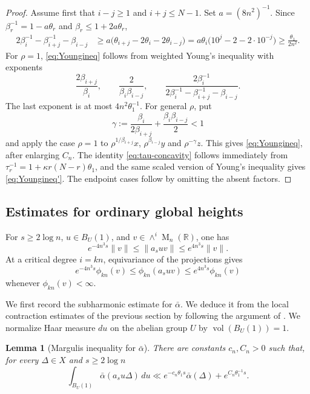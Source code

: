 \documentclass[reqno,11pt]{amsart}
\numberwithin{equation}{section}
\newtheorem{lemma}[theorem]{Lemma}
\theoremstyle{definition}
\theoremstyle{remark}
\newcommand{\op}{\operatorname}
\newcommand{\M}{\op{M}}
\begin{document}
\begin{proof}
Assume first that $i-j\ge1$ and $i+j\le N-1$. Set $a=(8n^2)^{-1}$. Since
$\beta_r^{-1}=1-a\theta_r$ and
$\beta_r\le1+2a\theta_r$,
$$
\begin{aligned}
2\beta_i^{-1}-\beta_{i+j}^{-1}-\beta_{i-j}
&\ge
 a\bigl(\theta_{i+j}-2\theta_i-2\theta_{i-j}\bigr)=a\theta_i\bigl(10^j-2-2\cdot10^{-j}\bigr)
\ge \frac{\theta_1}{2n^2}.
\end{aligned}
$$
For $\rho=1$, \eqref{eq:Youngineq} follows from weighted Young's
inequality with exponents
$$
\frac{2\beta_{i+j}}{\beta_i},
\qquad
\frac{2}{\beta_i\beta_{i-j}},
\qquad
\frac{2\beta_i^{-1}}
{2\beta_i^{-1}-\beta_{i+j}^{-1}-\beta_{i-j}}.
$$
The last exponent is at most $4n^2\theta_1^{-1}$. For general $\rho$,
put
$$
\gamma:=\frac{\beta_i}{2\beta_{i+j}}
+\frac{\beta_i\beta_{i-j}}2<1
$$
and apply the case $\rho=1$ to
$\rho^{1/\beta_{i+j}}x$, 
$\rho^{\beta_{i-j}}y$ and $\rho^{-\gamma}z$. This gives \eqref{eq:Youngineq}, after enlarging $C_n$. The identity \eqref{eq:tau-concavity} follows immediately from
$\tau_r^{-1}=1+\kappa r(N-r)\theta_1$, and the same scaled version of Young's inequality gives \eqref{eq:Youngineq'}. The endpoint cases follow by
omitting the absent factors.
\end{proof}

\subsection{Estimates for ordinary global heights}
For $s\ge 2\log n$, $u\in B_{U}(1)$, and
$v\in\wedge^i\M_n(\mathbb R)$, one has
\begin{equation}\label{eq:logLipschitzforwedge}
 e^{-4n^3 s}\|v\|
\le \|a_suv\|
\le e^{4n^3 s}\|v\|.
\end{equation}
At a critical degree $i=kn$, equivariance of the projections gives 
\begin{equation}\label{eq:logLipschitzformodifiedht}
e^{-4n^3s}\phi_{kn}(v)
\le \phi_{kn}(a_suv)
\le e^{4n^3s}\phi_{kn}(v)
\end{equation}
whenever $\phi_{kn}(v)<\infty$.

We first record the subharmonic estimate for $\bar\alpha$. We deduce it from the local contraction estimates of the previous section by following the argument of \cite{eskin-margulis-mozes:1998}. We normalize Haar measure $du$ on the abelian group $U$ by
$\operatorname{vol}(B_{U}(1))=1$.
\begin{lemma}[Margulis inequality for $\bar{\alpha}$]\label{prop:globalboundedexpansion'}
There are constants $c_n,C_n>0$ such that, for every $\Delta\in X$ and
$s\ge 2\log n$
\begin{equation}\label{eq:globalboundedexpansion'}
\int_{B_{U}(1)}
\bar\alpha(a_su\Delta)\,du
\ll
 e^{-c_n\theta_1 s}\bar\alpha(\Delta)
+
 e^{C_n\theta_1^{-1}s}.
\end{equation}
\end{lemma}
\end{document}
